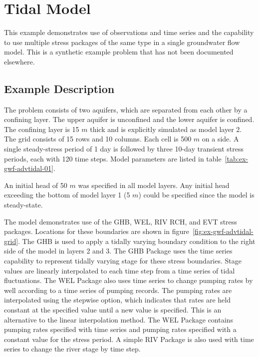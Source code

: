 \section{Tidal Model}

This example demonstrates use of \mf observations and time series and the capability to use multiple stress packages of the same type in a single groundwater flow model.  This is a synthetic example problem that has not been documented elsewhere.

\subsection{Example Description}

The problem consists of two aquifers, which are separated from each other by a confining layer. The upper aquifer is unconfined and the lower aquifer is confined.  The confining layer is 15 $m$ thick and is explicitly simulated as model layer 2. The grid consists of 15 rows and 10 columns.  Each cell is 500 $m$ on a side.  A single steady-stress period of 1 day is followed by three 10-day transient stress periods, each with 120 time steps.  Model parameters are listed in table~\ref{tab:ex-gwf-advtidal-01}. 



An initial head of 50 $m$ was specified in all model layers. Any initial head exceeding the bottom of model layer 1 (5 $m$) could be specified since the model is steady-state.

The model demonstrates use of the GHB, WEL, RIV RCH, and EVT stress packages. Locations for these boundaries are shown in figure~\ref{fig:ex-gwf-advtidal-grid}. The GHB is used to apply a tidally varying boundary condition to the right side of the model in layers 2 and 3.  The GHB Package uses the time series capability to represent  tidally varying stage for these stress boundaries.  Stage values are linearly interpolated to each time step from a time series of tidal fluctuations.  The WEL Package also uses time series to change pumping rates by well according to a time series of pumping records.  The pumping rates are interpolated using the stepwise option, which indicates that rates are held constant at the specified value until a new value is specified.  This is an alternative to the linear interpolation method.  The WEL Package contains pumping rates specified with time series and pumping rates specified with a constant value for the stress period.  A simple RIV Package is also used with time series to change the river stage by time step.  

